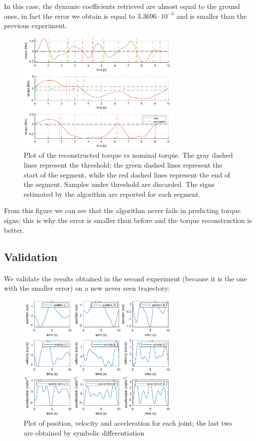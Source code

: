 \documentclass{article}
\begin{document}
In this case, the dynamic coefficients retrieved are almost equal to the ground ones, in fact the error we obtain is equal to   $3.3696\cdot10^{-5}$ and is smaller than the previous experiment.

\begin{figure}[!htbp]
\centering
\includegraphics[width=0.7\textwidth]{images/3-dof/results2.eps}
\caption{Plot of the reconstructed torque vs nominal torque. The gray dashed lines represent the threshold; the green dashed lines represent the start of the segment, while the red dashed lines represent the end of the segment. Samples under threshold are discarded. The signs estimated by the algorithm are reported for each segment.}
\end{figure}
\FloatBarrier

From this figure we can see that the algorithm never fails in predicting torque signs; this is why the error is smaller than before and the torque reconstruction is better.

\subsection{Validation} \paragraph{} We validate the results obtained in the second experiment (because it is the one with the smaller error) on a new never seen trajectory:

\begin{figure}[!htbp]
\centering
\includegraphics[width=0.7\textwidth]{images/3-dof/validation_trajectory.eps}
\caption{Plot of position, velocity and acceleration for each joint; the last two are obtained by symbolic differentiation}
\end{figure}
\FloatBarrier
\end{document}
